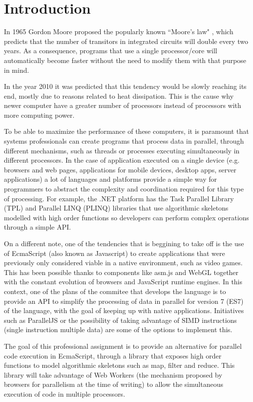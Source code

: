\section{Introduction}
In 1965 Gordon Moore proposed the popularly known ``Moore's law" \cite{moore65}, which predicts that the number of transitors in integrated circuits will double every two years.
As a consequence, programs that use a single processor/core will automatically become faster without the need to modify them with that purpose in mind.

In the year 2010 it was predicted \cite{itrs} that this tendency would be slowly reaching its end, mostly due to reasons related to heat dissipation. This is the cause why newer computer have a greater number of processors instead of processors with more computing power.

To be able to maximize the performance of these computers, it is paramount that systems professionals can create programs that process data in parallel, through different mechanisms, such as threads or processes executing simultaneously in different processors. In the case of application executed on a single device (e.g. browsers and web pages, applications for mobile devices, desktop apps, server applications) a lot of languages and platforms provide a simple way for programmers to abstract the complexity and coordination required for this type of processing. For example, the .NET platform has the Task Parallel Library (TPL) and Parallel LINQ (PLINQ) \cite{ms-par} libraries that use algorithmic skeletons modelled with high order functions so developers can perform complex operations through a simple API.

On a different note, one of the tendencies that is beggining to take off is the use of EcmaScript \cite{es-web} (also known as Javascript) to create applications that were previously only considered viable in a native environment, such as video games. This has been possible thanks to components like asm.js \cite{asm-web} and WebGL \cite{webgl-web} together with the constant evolution of browsers and JavaScript runtime engines.
In this context, one of the plans of the commitee that develops the language is to provide an API to simplify the processing of data in parallel for version 7 (ES7) of the language, with the goal of keeping up with native applications. Initiatives such as ParallelJS \cite{par-js} or the possibility of taking advantage of SIMD instructions \cite{js-simd} (single instruction multiple data) are some of the options to implement this.

The goal of this professional assignment is to provide an alternative for parallel code execution in EcmaScript, through a library that exposes high order functions to model algorithmic skeletons such as map, filter and reduce. This library will take advantage of Web Workers \cite{w3c-ww} (the mechanism proposed by browsers for parallelism at the time of writing) to allow the simultaneous execution of code in multiple processors.

\pagebreak